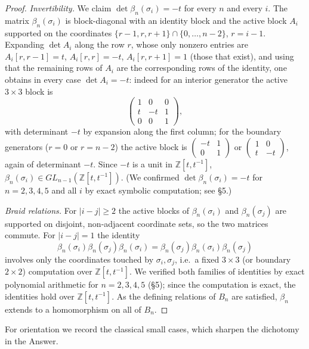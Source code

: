 \documentclass{amsart}
\theoremstyle{remark}
\begin{document}
\begin{proof}
\emph{Invertibility.} We claim $\det\beta_n(\sigma_i)=-t$ for every $n$ and
every $i$. The matrix $\beta_n(\sigma_i)$ is block-diagonal with an identity
block and the active block $A_i$ supported on the coordinates
$\{r-1,r,r+1\}\cap\{0,\dots,n-2\}$, $r=i-1$. Expanding $\det A_i$ along the row
$r$, whose only nonzero entries are $A_i[r,r-1]=t$, $A_i[r,r]=-t$,
$A_i[r,r+1]=1$ (those that exist), and using that the remaining rows of $A_i$ are
the corresponding rows of the identity, one obtains in every case
$\det A_i=-t$: indeed for an interior generator the active $3\times3$ block is
\[
\begin{pmatrix}1&0&0\\ t&-t&1\\ 0&0&1\end{pmatrix},
\]
with determinant $-t$ by expansion along the first column; for the boundary
generators ($r=0$ or $r=n-2$) the active block is
$\left(\begin{smallmatrix}-t&1\\0&1\end{smallmatrix}\right)$ or
$\left(\begin{smallmatrix}1&0\\ t&-t\end{smallmatrix}\right)$, again of
determinant $-t$. Since $-t$ is a unit in $\mathbb Z[t,t^{-1}]$,
$\beta_n(\sigma_i)\in GL_{n-1}(\mathbb Z[t,t^{-1}])$. (We confirmed
$\det\beta_n(\sigma_i)=-t$ for $n=2,3,4,5$ and all $i$ by exact symbolic
computation; see \S5.)

\emph{Braid relations.} For $|i-j|\ge2$ the active blocks of
$\beta_n(\sigma_i)$ and $\beta_n(\sigma_j)$ are supported on disjoint,
non-adjacent coordinate sets, so the two matrices commute. For $|i-j|=1$ the
identity
\[
\beta_n(\sigma_i)\beta_n(\sigma_j)\beta_n(\sigma_i)
=\beta_n(\sigma_j)\beta_n(\sigma_i)\beta_n(\sigma_j)
\]
involves only the coordinates touched by $\sigma_i,\sigma_j$, i.e.\ a fixed
$3\times3$ (or boundary $2\times2$) computation over $\mathbb Z[t,t^{-1}]$. We
verified both families of identities by exact polynomial arithmetic for
$n=2,3,4,5$ (\S5); since the computation is exact, the identities hold over
$\mathbb Z[t,t^{-1}]$. As the defining relations of $B_n$ are satisfied,
$\beta_n$ extends to a homomorphism on all of $B_n$.
\end{proof}

For orientation we record the classical small cases, which sharpen the
dichotomy in the Answer.
\end{document}
